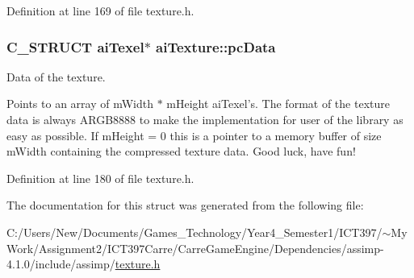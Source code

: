 Definition at line 169 of file texture.h.\hypertarget{structai_texture_eb07528748b6e49d2d81c60006024f9a}{
\subsubsection[pcData]{\setlength{\rightskip}{0pt plus 5cm}C\_\-STRUCT {\bf aiTexel}$\ast$ {\bf aiTexture::pcData}}}
\label{structai_texture_eb07528748b6e49d2d81c60006024f9a}


Data of the texture.

Points to an array of mWidth $\ast$ mHeight aiTexel's. The format of the texture data is always ARGB8888 to make the implementation for user of the library as easy as possible. If mHeight = 0 this is a pointer to a memory buffer of size mWidth containing the compressed texture data. Good luck, have fun! 

Definition at line 180 of file texture.h.

The documentation for this struct was generated from the following file:\begin{CompactItemize}
\item 
C:/Users/New/Documents/Games\_\-Technology/Year4\_\-Semester1/ICT397/$\sim$My Work/Assignment2/ICT397Carre/CarreGameEngine/Dependencies/assimp-4.1.0/include/assimp/\hyperlink{texture_8h}{texture.h}\end{CompactItemize}
